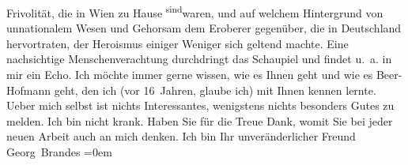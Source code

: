 \begin{ledgroupsized}[t]{13cm}
                    Frivolität, die in Wien zu Hause \substVorne{}\textsuperscript{sind}\substDazwischen{}waren\substHinten{}, und auf welchem Hintergrund von unnationalem Wesen und Gehorsam dem
                    Eroberer gegenüber, die in Deutschland
                    hervortraten, der Heroismus einiger Weniger sich geltend machte. Eine
                    nachsichtige Menschenverachtung durchdringt das Schaupiel und findet u. a. in
                    mir ein Echo.\pend
           \pstart
           Ich möchte immer gerne wissen, wie es {\pb}Ihnen geht und wie es Beer-Hofmann geht, den ich (vor 16 Jahren,
                    glaube ich) mit Ihnen kennen lernte.\pend
           \pstart
           Ueber mich selbst ist nichts Interessantes, wenigstens nichts besonders Gutes zu
                    melden. Ich bin nicht krank.\pend
           \pstart
           Haben Sie für die Treue Dank, womit Sie bei jeder neuen Arbeit auch an mich
                    denken.\pend
           \pstart
           Ich bin Ihr unveränderlicher Freund{\\[\baselineskip]}\spacefill\mbox{Georg Brandes}\pend
           \leftskip=0em{}\endnumbering{}\end{ledgroupsized}  \newcommand{\dateiname}{L01991}\newcommand{\titel}{Georg Brandes an Arthur Schnitzler, 18. 12. 1910}\newcommand{\editorInnen}{Martin Anton Müller und Gerd-Hermann Susen}
      